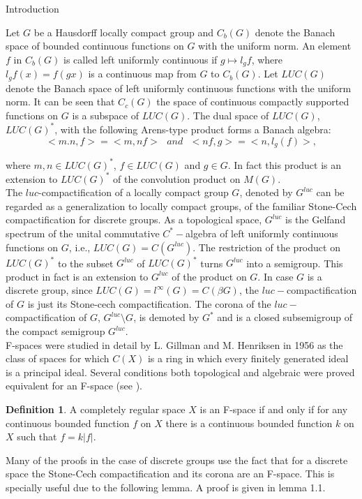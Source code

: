 \documentclass[12pt,a4paper]{amsart}
\theoremstyle{plain}
\theoremstyle{definition}
\newtheorem{definition}[theorem]{Definition}
\begin{document}
\begin{section}{Introduction}

 Let $G$ be a Hausdorff locally compact group and $C_b(G)$ denote the Banach space of bounded continuous functions on $G$ with the uniform norm. An element $f$ in $C_b(G)$ is called left uniformly continuous if $g\mapsto l_gf$, where $l_gf(x)=f(gx)$ is a continuous map from $G$ to $C_b(G)$. Let $LUC(G)$ denote the Banach space of left uniformly continuous functions with the uniform norm. It can be seen that $C_c(G)$ the space of continuous compactly supported functions on $G$ is a subspace of $LUC(G)$. The dual space of $LUC(G)$, $LUC(G)^*$, with the following Arens-type product forms a Banach algebra:
$$<m.n,f>=<m,nf>\ \ \ and \ \ \  < nf,g> = <n,l_g(f)>,$$

where $m,n\in LUC(G)^*$, $f\in LUC(G)$ and $g\in G.$ In fact this product is an extension to $LUC(G)^*$ of the convolution product on $M(G)$.\\

The $luc$-compactification of a locally compact group $G$, denoted by $G^{luc}$ can be regarded as a generalization to locally compact groups, of the familiar Stone-Cech compactification for discrete groups. As a topological space, $G^{luc}$ is the Gelfand spectrum of the unital commutative $C^*-$algebra of left uniformly continuous functions on $G$, i.e., $LUC(G)=C(G^{luc})$. The restriction of the product on $LUC(G)^*$ to the subset $G^{luc}$ of $LUC(G)^*$ turns $G^{luc}$ into a semigroup. This product in fact is an extension to $G^{luc}$ of the product on $G$. In case $G$ is a discrete group, since $LUC(G)=l^{\infty}(G)=C(\beta G)$, the $luc-$compactification of $G$ is just its Stone-cech compactification. The corona of the $luc-$compactification of $G$, $G^{luc}\setminus G$, is demoted by $G^*$ and is a closed subsemigroup of the compact semigroup $G^{luc}$.\\


F-spaces were studied in detail by L. Gillman and M. Henriksen in 1956 \cite{MR0078980} as the class of spaces for which $C(X)$ is a ring in which every finitely generated ideal is a principal ideal. Several conditions both topological and algebraic were proved equivalent for an F-space (see  \cite{MR0407579}).
\begin{definition}
A completely regular space $X$ is an F-space if and only if for any continuous bounded function $f$ on $X$ there is a continuous bounded function $k$ on $X$ such that $f=k |f|.$
\end{definition}
Many of the proofs in the case of discrete groups use the fact that for a discrete space the Stone-Cech compactification and its corona are an F-space. This is specially useful due to the following lemma. A proof is given in \cite{MR1297310} lemma 1.1.


\end{section}
\end{document}
